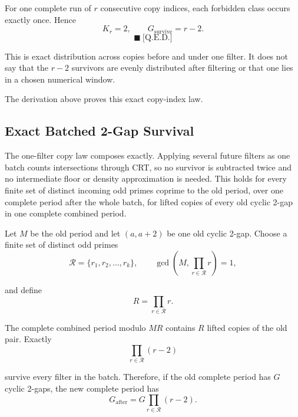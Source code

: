 For one complete run of $r$ consecutive copy indices, each forbidden
class occurs exactly once. Hence
\begin{equation*}
K_r=2,
\qquad
G_{\mathrm{survive}}=r-2.
\end{equation*}
\begin{equation*}
\blacksquare\ \text{[Q.E.D.]}
\end{equation*}

This is exact distribution across copies before and under one filter. It
does not say that the $r-2$ survivors are evenly distributed after
filtering or that one lies in a chosen numerical window.

{\raggedright
The derivation above proves this exact copy-index law. \par}

\subsection{Exact Batched 2-Gap Survival}
\label{sec:exact-batched-survival}

The one-filter copy law composes exactly. Applying several future
filters as one batch counts intersections through CRT, so no survivor is
subtracted twice and no intermediate floor or density approximation is
needed. This holds for every finite set of distinct incoming odd primes
coprime to the old period, over one complete period after the whole
batch, for lifted copies of every old cyclic 2-gap in one complete
combined period.

Let $M$ be the old period and let $(a,a+2)$ be one old cyclic 2-gap.
Choose a finite set of distinct odd primes
\begin{equation*}
\mathcal R=\{r_1,r_2,\ldots,r_k\},
\qquad
\gcd\!\left(M,\prod_{r\in\mathcal R}r\right)=1,
\end{equation*}

and define
\begin{equation*}
R=\prod_{r\in\mathcal R}r.
\end{equation*}

The complete combined period modulo $MR$ contains $R$ lifted copies of
the old pair. Exactly
\begin{equation*}
\prod_{r\in\mathcal R}(r-2)
\end{equation*}

survive every filter in the batch. Therefore, if the old complete period
has $G$ cyclic 2-gaps, the new complete period has
\begin{equation*}
G_{\mathrm{after}}
=G\prod_{r\in\mathcal R}(r-2).
\end{equation*}

